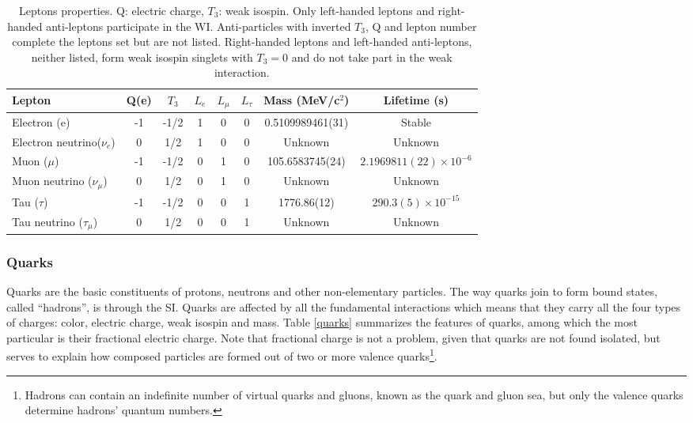 \begin{center}
\begin{table}[h]
\centering
\footnotesize
\begin{tabular}{lccccccc} \hline
Lepton                      & Q(e) & $T_3$&$L_e$ & $L_\mu$ & $L_\tau$ & Mass (MeV/c$^2$) & Lifetime (s)                \\ \hline
Electron (e)                & -1   & -1/2 & 1    & 0       & 0        & 0.5109989461(31) & Stable                      \\ %
Electron neutrino($\nu_e$)  & 0    &  1/2 & 1    & 0       & 0        & Unknown          & Unknown                     \\ %
Muon ($\mu$)                & -1   & -1/2 & 0    & 1       & 0        & 105.6583745(24)  & $2.1969811(22)\times10^{-6}$\\ %
Muon neutrino ($\nu_\mu$)   & 0    &  1/2 & 0    & 1       & 0        & Unknown          & Unknown                     \\ %
Tau ($\tau$)                & -1   & -1/2 & 0    & 0       & 1        & 1776.86(12)      & $290.3(5)\times10^{-15}$    \\ %
Tau neutrino ($\tau_\mu$)   & 0    &  1/2 & 0    & 0       & 1        & Unknown          & Unknown                     \\ \hline
\end{tabular}
\caption[Leptons properties.]{Leptons properties\cite{pdg}. Q: electric charge, $T_3$: weak isospin. Only left-handed leptons and right-handed anti-leptons participate in the WI. Anti-particles with inverted $T_3$, Q and lepton number complete the leptons set but are not listed. Right-handed leptons and left-handed anti-leptons, neither listed, form weak isospin singlets with $T_3=0$ and do not take part in the weak interaction.}\label{leptons}
\end{table}
\end{center}

\subsubsection{Quarks}

\noindent Quarks are the basic constituents of protons, neutrons and other non-elementary particles. The way quarks join to form bound states, called ``hadrons'', is through the SI. Quarks are affected by all the fundamental interactions which means that they carry all the four types of charges: color, electric charge, weak isospin and mass. Table \ref{quarks} summarizes the features of quarks, among which the most particular is their fractional electric charge. Note that fractional charge is not a problem, given that quarks are not found isolated, but serves to explain how composed particles are formed out of two or more valence quarks\footnote{Hadrons can contain an indefinite number of virtual quarks and gluons, known as the quark and gluon sea, but only the valence quarks determine hadrons' quantum numbers.}.

